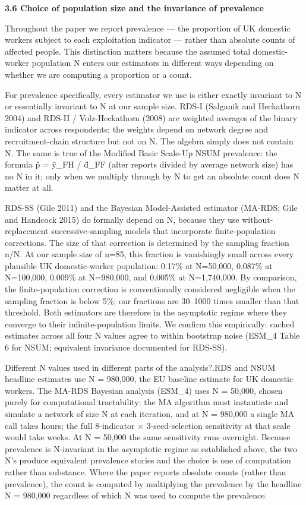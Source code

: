 \documentclass[
  12pt,
  letterpaper,
  DIV=11,
  numbers=noendperiod]{scrartcl}
\begin{document}
\textbf{3.6 Choice of population size and the invariance of prevalence}

Throughout the paper we report prevalence --- the proportion of UK
domestic workers subject to each exploitation indicator --- rather than
absolute counts of affected people. This distinction matters because the
assumed total domestic-worker population N enters our estimators in
different ways depending on whether we are computing a proportion or a
count.

For prevalence specifically, every estimator we use is either exactly
invariant to N or essentially invariant to N at our sample size. RDS-I
(Salganik and Heckathorn 2004) and RDS-II / Volz-Heckathorn (2008) are
weighted averages of the binary indicator across respondents; the
weights depend on network degree and recruitment-chain structure but not
on N. The algebra simply does not contain N. The same is true of the
Modified Basic Scale-Up NSUM prevalence: the formula p̂ = ȳ\_FH / d̄\_FF
(alter reports divided by average network size) has no N in it; only
when we multiply through by N to get an absolute count does N matter at
all.

RDS-SS (Gile 2011) and the Bayesian Model-Assisted estimator (MA-RDS;
Gile and Handcock 2015) do formally depend on N, because they use
without-replacement successive-sampling models that incorporate
finite-population corrections. The size of that correction is determined
by the sampling fraction n/N. At our sample size of n=85, this fraction
is vanishingly small across every plausible UK domestic-worker
population: 0.17\% at N=50,000, 0.087\% at N=100,000, 0.009\% at
N=980,000, and 0.005\% at N=1,740,000. By comparison, the
finite-population correction is conventionally considered negligible
when the sampling fraction is below 5\%; our fractions are 30--1000
times smaller than that threshold. Both estimators are therefore in the
asymptotic regime where they converge to their infinite-population
limits. We confirm this empirically: cached estimates across all four N
values agree to within bootstrap noise (ESM\_4 Table 6 for NSUM;
equivalent invariance documented for RDS-SS).

Different N values used in different parts of the analysis?.RDS and NSUM
headline estimates use N = 980,000, the EU baseline estimate for UK
domestic workers. The MA-RDS Bayesian analysis (ESM\_4) uses N = 50,000,
chosen purely for computational tractability: the MA algorithm must
instantiate and simulate a network of size N at each iteration, and at N
= 980,000 a single MA call takes hours; the full 8-indicator ×
3-seed-selection sensitivity at that scale would take weeks. At N =
50,000 the same sensitivity runs overnight. Because prevalence is
N-invariant in the asymptotic regime as established above, the two N's
produce equivalent prevalence stories and the choice is one of
computation rather than substance. Where the paper reports absolute
counts (rather than prevalence), the count is computed by multiplying
the prevalence by the headline N = 980,000 regardless of which N was
used to compute the prevalence.
\end{document}
